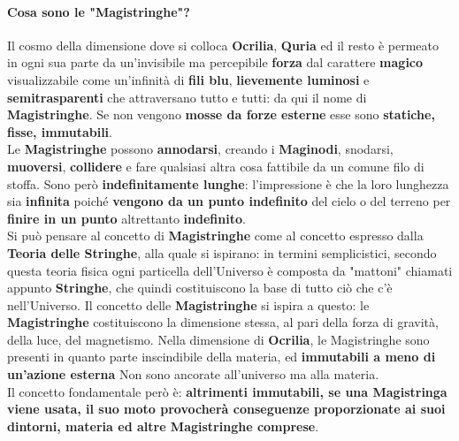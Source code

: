 \documentclass[10pt,twoside,onecolumn,openany]{book}
\begin{document}
\paragraph{Cosa sono le "Magistringhe"?} Il cosmo della dimensione dove si colloca \textbf{Ocrilia}, \textbf{Quria} ed il resto è permeato in ogni sua parte da un'invisibile ma percepibile \textbf{forza} dal carattere \textbf{magico} visualizzabile come un'infinità di \textbf{fili blu}, \textbf{lievemente luminosi} e \textbf{semitrasparenti} che attraversano tutto e tutti: da qui il nome di \textbf{Magistringhe}. Se non vengono \textbf{mosse da forze esterne} esse sono \textbf{statiche, fisse, immutabili}.\\
Le \textbf{Magistringhe} possono \textbf{annodarsi}, creando i \textbf{Maginodi}, snodarsi, \textbf{muoversi}, \textbf{collidere} e fare qualsiasi altra cosa fattibile da un comune filo di stoffa. Sono però \textbf{indefinitamente lunghe}: l'impressione è che la loro lunghezza sia \textbf{infinita} poiché \textbf{vengono da un punto indefinito} del cielo o del terreno per \textbf{finire in un punto} altrettanto \textbf{indefinito}.\\
Si può pensare al concetto di \textbf{Magistringhe} come al concetto espresso dalla \textbf{Teoria delle Stringhe}, alla quale si ispirano: in termini semplicistici, secondo questa teoria fisica ogni particella dell'Universo è composta da "mattoni" chiamati appunto \textbf{Stringhe}, che quindi costituiscono la base di tutto ciò che c'è nell'Universo. Il concetto delle \textbf{Magistringhe} si ispira a questo: le \textbf{Magistringhe} costituiscono la dimensione stessa, al pari della forza di gravità, della luce, del magnetismo. Nella dimensione di \textbf{Ocrilia}, le Magistringhe sono presenti in quanto parte inscindibile della materia, ed \textbf{immutabili a meno di un'azione esterna} Non sono ancorate all'universo ma alla materia.\\
Il concetto fondamentale però è: \textbf{altrimenti immutabili, se una Magistringa viene usata, il suo moto provocherà conseguenze proporzionate ai suoi dintorni, materia ed altre Magistringhe comprese}.
\end{document}
